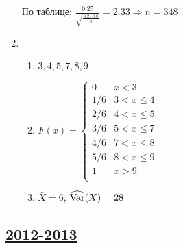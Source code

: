 \begin{enumerate}
По таблице: $\frac{0.25}{\sqrt{\frac{0.2\cdot0.8}{n}}} = 2.33 \Rightarrow n = 348$
\item
\begin{enumerate}
\item $3, 4, 5, 7, 8, 9$
\item $F(x) = \begin{cases}
0 &  x < 3 \\
1/6 & 3 < x \leq 4 \\
2/6 & 4 < x \leq 5 \\
3/6 & 5 < x \leq 7 \\
4/6 & 7 < x \leq 8 \\
5/6 & 8 < x \leq 9 \\
1 &  x > 9 \\
\end{cases}$
\item $\bar{X} = 6$, $\widehat{\operatorname{Var}}(X) = 28$
\end{enumerate}
\end{enumerate}




\subsection[2012-2013]{\hyperref[sec:kr_02_2012_2013]{2012-2013}}
\label{sec:sol_kr_02_2012_2013}

